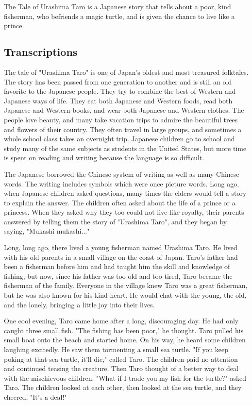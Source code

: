 The Tale of Urashima Taro is a Japanese story that tells about a poor, kind fisherman, who befriends a magic turtle, and is given the chance to live like a prince.

\subsection{Transcriptions}

The tale of "Urashima Taro" is one of Japan's oldest and most treasured folktales. The story has been passed from one generation to another and is still an old favorite to the Japanese people. They try to combine the best of Western and Japanese ways of life. They eat both Japanese and Western foods, read both Japanese and Western books, and wear both Japanese and Western clothes. The people love beauty, and many take vacation trips to admire the beautiful trees and flowers of their country. They often travel in large groups, and sometimes a whole school class takes an overnight trip. Japanese children go to school and study many of the same subjects as students in the United States, but more time is spent on reading and writing because the language is so difficult.

The Japanese borrowed the Chinese system of writing as well as many Chinese words. The writing includes symbols which were once picture words. Long ago, when Japanese children asked questions, many times the elders would tell a story to explain the answer. The children often asked about the life of a prince or a princess. When they asked why they too could not live like royalty, their parents answered by telling them the story of "Urashima Taro", and they began by saying, "Mukashi mukashi..."

Long, long ago, there lived a young fisherman named Urashima Taro. He lived with his old parents in a small village on the coast of Japan. Taro's father had been a fisherman before him and had taught him the skill and knowledge of fishing, but now, since his father was too old and too tired, Taro became the fisherman of the family. Everyone in the village knew Taro was a great fisherman, but he was also known for his kind heart. He would chat with the young, the old, and the lonely, bringing a little joy into their lives.

One cool evening, Taro came home after a long, discouraging day. He had only caught three small fish. "The fishing has been poor," he thought. Taro pulled his small boat onto the beach and started home. On his way, he heard some children laughing excitedly. He saw them tormenting a small sea turtle. "If you keep poking at that sea turtle, it'll die," called Taro. The children paid no attention and continued teasing the creature. Then Taro thought of a better way to deal with the mischievous children. "What if I trade you my fish for the turtle?" asked Taro. The children looked at each other, then looked at the sea turtle, and they cheered, "It's a deal!"

